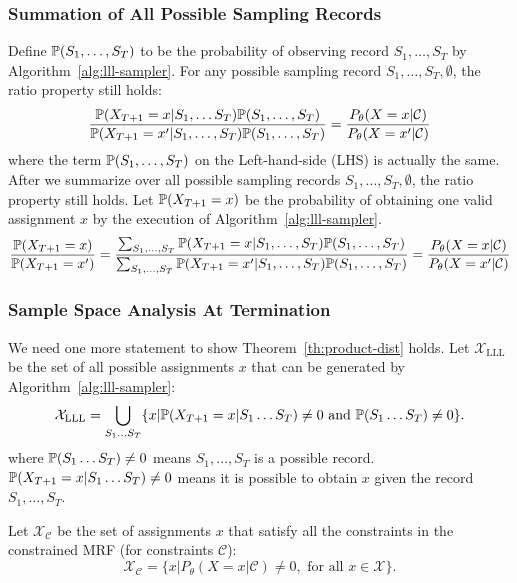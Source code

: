 \subsubsection{Summation of All Possible Sampling Records} Define $\mathbb{P}(S_1,\ldots,S_T)$ to be the probability of observing record $S_1,\ldots,S_T$ by Algorithm~\ref{alg:lll-sampler}.
For any possible sampling record $S_1,\ldots,S_{T}, \emptyset$, the ratio property still holds:
\begin{equation*}
\frac{\mathbb{P}(X_{T+1}=x|S_1,\ldots S_T)\mathbb{P}(S_1,\ldots,S_T)}{\mathbb{P}(X_{T+1}=x'|S_1,\ldots,S_T)\mathbb{P}(S_1,\ldots,S_T)}=\frac{P_{\theta}(X=x|\mathcal{C})}{P_{\theta}(X=x'|\mathcal{C})}
\end{equation*}
where the term $\mathbb{P}(S_1,\ldots,S_T)$ on the Left-hand-side (LHS) is actually the same.
After we summarize over all possible sampling records $S_1,\ldots,S_{T},\emptyset$, the ratio property still holds. Let $\mathbb{P}(X_{T+1}=x)$ be the probability of obtaining one valid assignment $x$ by the execution of Algorithm~\ref{alg:lll-sampler}.
\begin{equation} \label{eq:ratio-final}
\frac{\mathbb{P}(X_{T+1}=x)}{\mathbb{P}(X_{T+1}=x')}=\frac{\sum_{S_1,\ldots,S_T}\mathbb{P}(X_{T+1}=x|S_1,\ldots,S_T)\mathbb{P}(S_1,\ldots,S_T)}{\sum_{S_1,\ldots,S_T}\mathbb{P}(X_{T+1}=x'|S_1,\ldots,S_T)\mathbb{P}(S_1,\ldots,S_T)}=\frac{P_{\theta}(X=x|\mathcal{C})}{P_{\theta}(X=x'|\mathcal{C})}
\end{equation}

\subsubsection{Sample Space Analysis At Termination}
We need one more statement to show Theorem~\ref{th:product-dist} holds. Let $\mathcal{X}_{\text{LLL}}$ be the set of all possible  assignments $x$ that can be generated by Algorithm~\ref{alg:lll-sampler}:
\begin{equation*}
\mathcal{X}_{\text{LLL}}=\bigcup_{S_1\ldots S_T}\{x|\mathbb{P}(X_{T+1}=x|S_1\ldots S_T) \neq 0 \text{ and } \mathbb{P}(S_1\ldots S_T)\neq 0\}.
\end{equation*}
{where $ \mathbb{P}(S_1\ldots S_T)\neq 0$ means $S_1,\ldots,S_T$ is a possible record. $\mathbb{P}(X_{T+1}=x|S_1\ldots S_T) \neq 0$ means it is possible to obtain $x$ given the record $S_1,\ldots,S_T$.}

Let $\mathcal{X}_{\mathcal{C}}$ be the set of assignments $x$ that satisfy all the constraints in the constrained MRF (for constraints $\mathcal{C}$):
\begin{equation*}
\mathcal{X}_{\mathcal{C}}=\{x|P_{\theta}(X=x|\mathcal{C}) \neq 0, \text{ for all }x\in\mathcal{X}\}.
\end{equation*}


